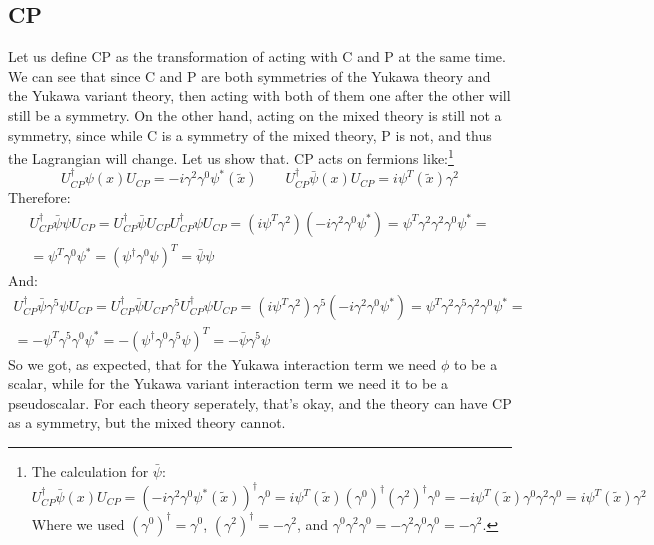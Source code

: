\documentclass{article}
\begin{document}
\subsection{CP}
Let us define CP as the transformation of acting with C and P at the same time. We can see that since C and P are both symmetries of the Yukawa theory and the Yukawa variant theory, then acting with both of them one after the other will still be a symmetry. On the other hand, acting on the mixed theory is still not a symmetry, since while C is a symmetry of the mixed theory, P is not, and thus the Lagrangian will change. Let us show that.
\newline
CP acts on fermions like:\footnote{The calculation for $\bar{\psi}$:
\begin{equation}
    U_{CP}^\dagger \bar{\psi}(x) U_{CP} =
    \left(-i\gamma^2\gamma^0\psi^*(\tilde{x})\right)^\dagger\gamma^0 =
    i\psi^T(\tilde{x})(\gamma^0)^\dagger(\gamma^2)^\dagger\gamma^0 =
    -i\psi^T(\tilde{x})\gamma^0\gamma^2\gamma^0 =
    i\psi^T(\tilde{x})\gamma^2
\end{equation}
Where we used $(\gamma^0)^\dagger = \gamma^0$, $(\gamma^2)^\dagger = -\gamma^2$, and $\gamma^0\gamma^2\gamma^0 = -\gamma^2\gamma^0\gamma^0 = -\gamma^2$.
}
\begin{equation}
    U_{CP}^\dagger \psi(x) U_{CP} = -i\gamma^2\gamma^0\psi^*(\tilde{x})
    \qquad
    U_{CP}^\dagger \bar{\psi}(x) U_{CP} = i\psi^T(\tilde{x})\gamma^2
\end{equation}
Therefore:
\begin{equation}
\begin{gathered}
    U_{CP}^\dagger \bar{\psi}\psi U_{CP} = 
    U_{CP}^\dagger \bar{\psi} U_{CP} U_{CP}^\dagger \psi U_{CP} = 
    \left(i\psi^T\gamma^2\right) \left(-i\gamma^2\gamma^0\psi^*\right) = 
    \psi^T\gamma^2\gamma^2\gamma^0\psi^* = \\ =
    \psi^T\gamma^0\psi^* = 
    \left(\psi^\dagger\gamma^0\psi\right)^T = \bar{\psi}\psi
\end{gathered}
\end{equation}
And:
\begin{equation}
\begin{gathered}
    U_{CP}^\dagger \bar{\psi} \gamma^5 \psi U_{CP} = 
    U_{CP}^\dagger \bar{\psi} U_{CP} \gamma^5 U_{CP}^\dagger \psi U_{CP} = 
    \left(i\psi^T\gamma^2\right)\gamma^5\left(-i\gamma^2\gamma^0\psi^*\right) = 
    \psi^T\gamma^2\gamma^5\gamma^2\gamma^0\psi^* = \\ =
    -\psi^T\gamma^5\gamma^0\psi^* = 
    -\left(\psi^\dagger\gamma^0\gamma^5\psi\right)^T = -\bar{\psi}\gamma^5\psi
\end{gathered}
\end{equation}
So we got, as expected, that for the Yukawa interaction term we need $\phi$ to be a scalar, while for the Yukawa variant interaction term we need it to be a pseudoscalar. For each theory seperately, that's okay, and the theory can have CP as a symmetry, but the mixed theory cannot.
\end{document}
